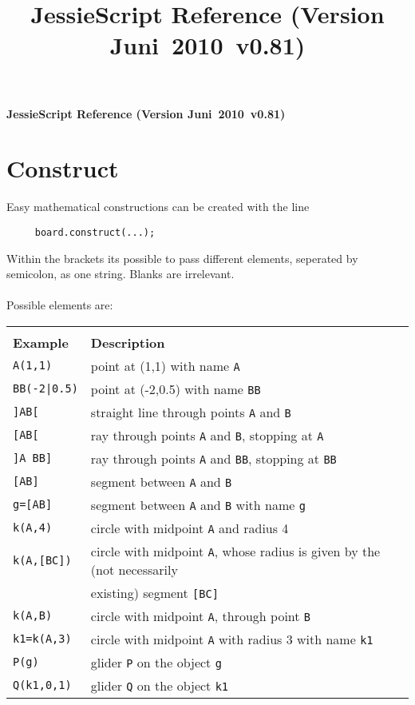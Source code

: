 \documentclass[10pt]{article}
\def\versionnumber{0.81}  %
\def\year{2010}
\def\month{Juni}
\def\version{\month\ \year\ v\versionnumber}
\begin{document}
\title{JessieScript Reference (Version \version)}
\begin{center} {\LARGE\textbf {JessieScript Reference (Version
\version)}}
\end{center}
\section{Construct}
Easy mathematical constructions can be created with the line
\begin{verbatim}
     board.construct(...);
\end{verbatim} Within the brackets its possible to pass different
elements, seperated by semicolon, as one string. Blanks are
irrelevant.
\\\\ Possible elements are: \\ \begin{tabular}{|l|l|} \hline \\[-0.75em] {\large
\textbf{Example}} & {\large \textbf{Description}} \\
\hline\hline \verb+A(1,1)+ & point at (1,1) with name \verb'A'
\\ \hline \verb+BB(-2|0.5)+ & point at
(-2,0.5) with name \verb'BB' \\
\hline\verb+]AB[+ & straight line through points \verb'A' and \verb'B' \\
\hline\verb+[AB[+ &
ray through points \verb'A' and \verb'B', stopping at \verb'A' \\
\hline\verb+]A BB]+ & ray through points \verb'A' and \verb'BB',
stopping at \verb'BB'
\\ \hline\verb+[AB]+ & segment between \verb'A' and \verb'B' \\
\hline \verb+g=[AB]+ & segment between \verb'A' and \verb'B' with name \verb'g' \\
\hline\verb+k(A,4)+ & circle with midpoint \verb'A' and radius 4 \\
\hline\verb+k(A,[BC])+ & circle with midpoint \verb'A', whose
radius is given by the (not necessarily
\\ & existing) segment \verb'[BC]' \\ \hline\verb+k(A,B)+ & circle with midpoint \verb'A',
through point \verb'B' \\
\hline\verb+k1=k(A,3)+ & circle with midpoint \verb'A' with radius
3 with name \verb'k1'
\\ \hline\verb+P(g)+ & glider \verb'P' on the object \verb'g' \\
\hline\verb+Q(k1,0,1)+ & glider \verb'Q' on the object \verb'k1'

\end{tabular}
\end{document}
